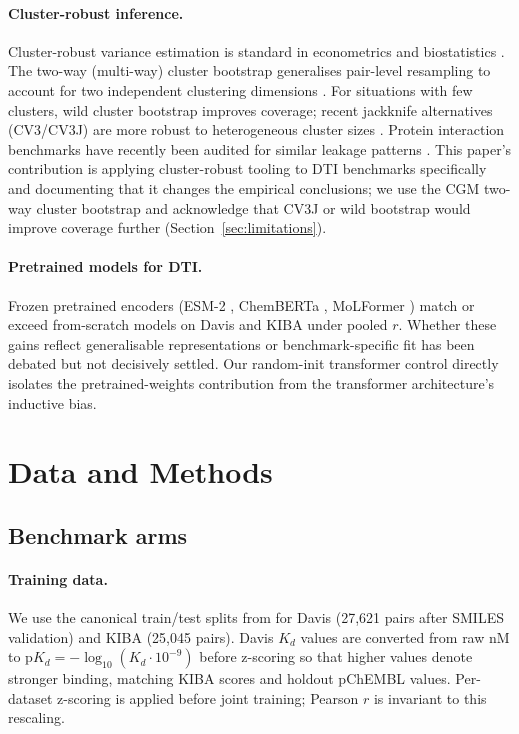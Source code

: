 \documentclass[11pt,a4paper]{article}
\begin{document}
\paragraph{Cluster-robust inference.}
Cluster-robust variance estimation is standard in econometrics and biostatistics
\citep{cameron2015practitioner,liang1986longitudinal}.
The two-way (multi-way) cluster bootstrap generalises pair-level resampling to
account for two independent clustering dimensions
\citep{cameron2011robust,efron1979bootstrap}.
For situations with few clusters, wild cluster bootstrap
\citep{mackinnon2017wild} improves coverage; recent jackknife alternatives
(CV3/CV3J) are more robust to heterogeneous cluster sizes
\citep{mackinnon2023fast}.
Protein interaction benchmarks have recently been audited for similar leakage
patterns \citep{bushuiev2024revealing}.
This paper's contribution is applying cluster-robust tooling to DTI benchmarks
specifically and documenting that it changes the empirical conclusions;
we use the CGM two-way cluster bootstrap \citep{cameron2011robust} and
acknowledge that CV3J or wild bootstrap would improve coverage further
(Section~\ref{sec:limitations}).

\paragraph{Pretrained models for DTI.}
Frozen pretrained encoders (ESM-2 \citep{lin2023evolutionary}, ChemBERTa
\citep{chithrananda2020chemberta}, MoLFormer \citep{ross2022large}) match or
exceed from-scratch models on Davis and KIBA under pooled $r$.
Whether these gains reflect generalisable representations or benchmark-specific
fit has been debated but not decisively settled.
Our random-init transformer control directly isolates the pretrained-weights
contribution from the transformer architecture's inductive bias.

\section{Data and Methods}

\subsection{Benchmark arms}

\paragraph{Training data.}
We use the canonical train/test splits from \citet{ozturk2018deepdta} for Davis
(27{,}621 pairs after SMILES validation) and KIBA (25{,}045 pairs).
Davis $K_d$ values are converted from raw nM to $\text{p}K_d = -\log_{10}(K_d \cdot
10^{-9})$ before z-scoring so that higher values denote stronger binding,
matching KIBA scores and holdout pChEMBL values.
Per-dataset z-scoring is applied before joint training; Pearson $r$ is
invariant to this rescaling.
\end{document}
